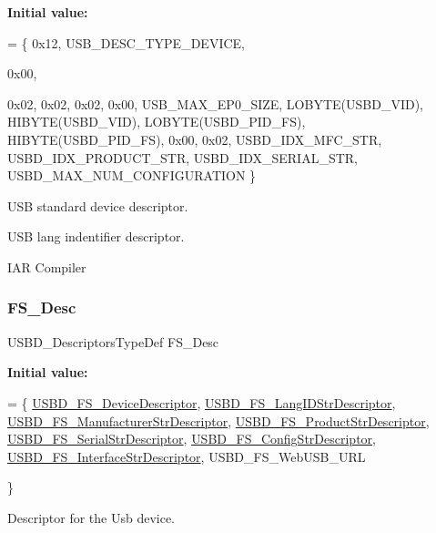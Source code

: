 {\bfseries Initial value\+:}
\begin{DoxyCode}
=
    \{
        0x12,                 
        USB\_DESC\_TYPE\_DEVICE, 





        0x00, 

        0x02,
        0x02,                
        0x02,                
        0x00,                
        USB\_MAX\_EP0\_SIZE,    
        LOBYTE(USBD\_VID),    
        HIBYTE(USBD\_VID),    
        LOBYTE(USBD\_PID\_FS), 
        HIBYTE(USBD\_PID\_FS), 
        0x00,                
        0x02,
        USBD\_IDX\_MFC\_STR,          
        USBD\_IDX\_PRODUCT\_STR,      
        USBD\_IDX\_SERIAL\_STR,       
        USBD\_MAX\_NUM\_CONFIGURATION 
\}
\end{DoxyCode}
U\+SB standard device descriptor.

U\+SB lang indentifier descriptor.

I\+AR Compiler \mbox{\label{group__USBD__DESC__Private__Variables_gae36d67393118d9d8531a8d633e23a797}} 
\subsubsection{\texorpdfstring{F\+S\+\_\+\+Desc}{FS\_Desc}}
{\footnotesize\ttfamily U\+S\+B\+D\+\_\+\+Descriptors\+Type\+Def F\+S\+\_\+\+Desc}

{\bfseries Initial value\+:}
\begin{DoxyCode}
=
    \{
        \hyperlink{group__USBD__DESC__Private__Functions_ga14798be38c08a37163e53167032485ff}{USBD\_FS\_DeviceDescriptor}, 
      \hyperlink{group__USBD__DESC__Private__Functions_gac02628ceb6a6a071e192dcb85063c0cc}{USBD\_FS\_LangIDStrDescriptor}, 
      \hyperlink{group__USBD__DESC__Private__Functions_ga6427a671827813efe1a46c3dfcb05683}{USBD\_FS\_ManufacturerStrDescriptor},
        \hyperlink{group__USBD__DESC__Private__Functions_ga0ec558c0303daabb851d584109a56514}{USBD\_FS\_ProductStrDescriptor}, 
      \hyperlink{group__USBD__DESC__Private__Functions_gaad2a1d1451821845eda602a82b1cd213}{USBD\_FS\_SerialStrDescriptor}, 
      \hyperlink{group__USBD__DESC__Private__Functions_ga40ed2a0fb60c50a285983a09ba6921d6}{USBD\_FS\_ConfigStrDescriptor},
        \hyperlink{group__USBD__DESC__Private__Functions_gab248f43276f92d982ab5853111e4fb10}{USBD\_FS\_InterfaceStrDescriptor}, USBD\_FS\_WebUSB\_URL



 
\}
\end{DoxyCode}
Descriptor for the Usb device. 